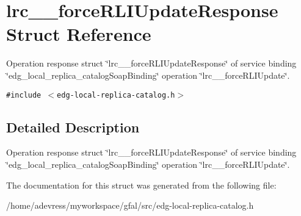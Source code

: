 \section{lrc\_\-\_\-force\-RLIUpdate\-Response Struct Reference}
\label{structlrc____forceRLIUpdateResponse}
Operation response struct \char`\"{}lrc\_\-\_\-force\-RLIUpdate\-Response\char`\"{} of service binding \char`\"{}edg\_\-local\_\-replica\_\-catalog\-Soap\-Binding\char`\"{} operation \char`\"{}lrc\_\-\_\-force\-RLIUpdate\char`\"{}.  


{\tt \#include $<$edg-local-replica-catalog.h$>$}



\subsection{Detailed Description}
Operation response struct \char`\"{}lrc\_\-\_\-force\-RLIUpdate\-Response\char`\"{} of service binding \char`\"{}edg\_\-local\_\-replica\_\-catalog\-Soap\-Binding\char`\"{} operation \char`\"{}lrc\_\-\_\-force\-RLIUpdate\char`\"{}. 



The documentation for this struct was generated from the following file:\begin{CompactItemize}
\item 
/home/adevress/myworkspace/gfal/src/edg-local-replica-catalog.h\end{CompactItemize}
